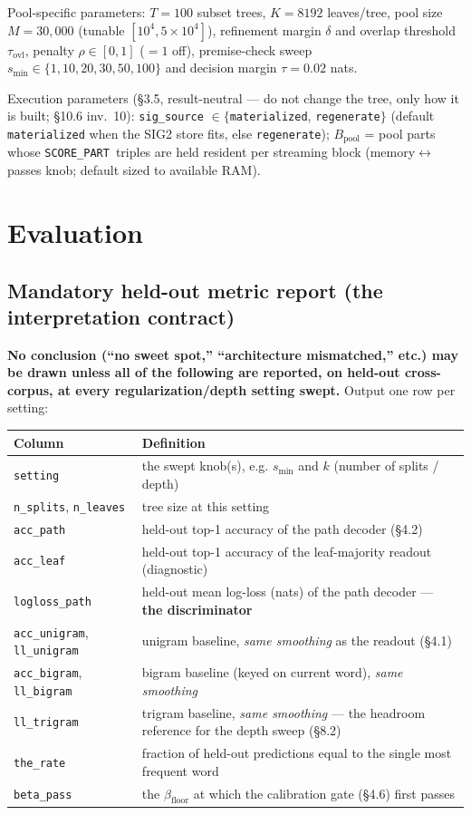 \documentclass[11pt]{article}
\newcommand{\code}[1]{\texttt{#1}}
\newcommand{\score}{\code{SCORE\_PART}}
\begin{document}
\medskip\noindent Pool-specific parameters: $T=100$ subset trees, $K=8192$ leaves/tree, pool size $M=30{,}000$ (tunable $[10^4,5\times10^4]$), refinement margin $\delta$ and overlap threshold $\tau_{\text{ovl}}$, penalty $\rho\in[0,1]$ ($=1$ off), premise-check sweep $s_{\min}\in\{1,10,20,30,50,100\}$ and decision margin $\tau=0.02$ nats.

\medskip\noindent Execution parameters (\S3.5, result-neutral --- do not change the tree, only how it is built; \S10.6 inv.~10): \code{sig\_source} $\in\{$\code{materialized}, \code{regenerate}$\}$ (default \code{materialized} when the SIG2 store fits, else \code{regenerate}); $B_{\text{pool}}$ = pool parts whose \score\ triples are held resident per streaming block (memory$\leftrightarrow$passes knob; default sized to available RAM).

\section{Evaluation}

\subsection{Mandatory held-out metric report (the interpretation contract)}
\textbf{No conclusion (``no sweet spot,'' ``architecture mismatched,'' etc.) may be drawn unless all of the following are reported, on held-out cross-corpus, at every regularization/depth setting swept.} Output one row per setting:

\begin{center}
\begin{longtable}{@{}ll@{}}
\toprule
Column & Definition\\
\midrule
\endhead
\code{setting} & the swept knob(s), e.g. $s_{\min}$ and $k$ (number of splits / depth)\\
\code{n\_splits}, \code{n\_leaves} & tree size at this setting\\
\code{acc\_path} & held-out top-1 accuracy of the path decoder (\S4.2)\\
\code{acc\_leaf} & held-out top-1 accuracy of the leaf-majority readout (diagnostic)\\
\code{logloss\_path} & held-out mean log-loss (nats) of the path decoder --- \textbf{the discriminator}\\
\code{acc\_unigram}, \code{ll\_unigram} & unigram baseline, \emph{same smoothing} as the readout (\S4.1)\\
\code{acc\_bigram}, \code{ll\_bigram} & bigram baseline (keyed on current word), \emph{same smoothing}\\
\code{ll\_trigram} & trigram baseline, \emph{same smoothing} --- the headroom reference for the depth sweep (\S8.2)\\
\code{the\_rate} & fraction of held-out predictions equal to the single most frequent word\\
\code{beta\_pass} & the $\beta_{\text{floor}}$ at which the calibration gate (\S4.6) first passes\\
\bottomrule
\end{longtable}
\end{center}
\end{document}
